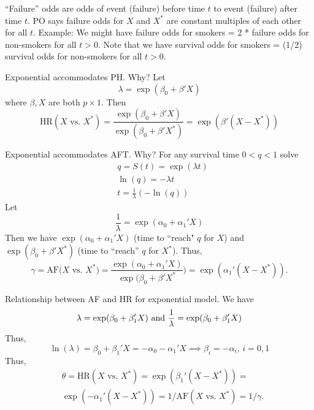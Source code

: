\documentclass{article}
\begin{document}
 ``Failure'' odds are odds of event (failure) before time $t$ to event (failure) after time $t$. PO says failure odds for $X$ and $X^*$ are constant multiples of each other for all $t$. Example: We might have failure odds for smokers = 2 * failure odds for non-smokers for all $t>0$. Note that we have survival odds for smokers = (1/2) survival odds for non-smokers for all $t>0$.

 Exponential accommodates PH. Why? Let
\[
\lambda=\exp(\beta_0 + \beta' X)
\] where $\beta, X$ are both $p \times 1$.
Then
\[
\text{HR}(X \text{ vs. } X^*)  = \dfrac{\exp(\beta_0 + \beta' X)}{\exp(\beta_0 + \beta' X^*)} = \exp(\beta'(X - X^*))
\]

 Exponential accommodates AFT. Why? For any survival time $0 < q < 1$ solve
\begin{align*}
& q = S(t) = \exp(\lambda t) \\
& \ln(q) = - \lambda t \\
& t = \frac{1}{\lambda} (- \ln(q))
\end{align*}
Let
\[
\frac{1}{\lambda} = \exp(\alpha_0 + \alpha_1'X)
\]
Then we have $\exp(\alpha_0 + \alpha_1'X)$ (time to ``reach" $q$ for $X$) and \\ $\exp(\beta_0 + \beta'X^*)$ (time to ``reach'' $q$ for $X^*$). Thus,
\[
\gamma = \text{AF($X$ vs. $X^*$)} = \frac{\exp(\alpha_0 + \alpha_1'X)}{\exp(\beta_0 + \beta'X^*}) = \exp(\alpha_1'(X-X^*)).
\]

 Relationship between AF and HR for exponential model. We have
\[
\lambda = \exp(\beta_0 + \beta_1'X) \text{ and } \frac{1}{\lambda} = \exp(\beta_0 + \beta_1'X) \\
\]
Thus,
\[ \ln(\lambda) = \beta_0 + \beta_1'X = -\alpha_0 - \alpha_1'X \implies \beta_i = -\alpha_i, \, i=0,1 \]
Thus,
\begin{align*}
&\theta = \text{HR}(X \text{ vs. } X^*) = \exp(\beta_1'(X - X^*)) =\\
&\exp(-\alpha_1'(X - X^*)) = 1/\text{AF}(X \text{ vs. } X^*) = 1/\gamma.
\end{align*}
\end{document}
